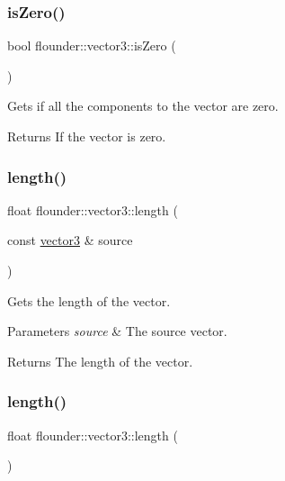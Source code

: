 \subsubsection{\texorpdfstring{is\+Zero()}{isZero()}}
{\footnotesize\ttfamily bool flounder\+::vector3\+::is\+Zero (\begin{DoxyParamCaption}{ }\end{DoxyParamCaption})}



Gets if all the components to the vector are zero. 

\begin{DoxyReturn}{Returns}
If the vector is zero. 
\end{DoxyReturn}
\mbox{\label{classflounder_1_1vector3_a2264de66d0b62a4a996586a9638650da}} 
\subsubsection{\texorpdfstring{length()}{length()}\hspace{0.1cm}{\footnotesize\ttfamily [1/2]}}
{\footnotesize\ttfamily float flounder\+::vector3\+::length (\begin{DoxyParamCaption}\item[{const \hyperlink{classflounder_1_1vector3}{vector3} \&}]{source }\end{DoxyParamCaption})\hspace{0.3cm}{\ttfamily [static]}}



Gets the length of the vector. 


\begin{DoxyParams}{Parameters}
{\em source} & The source vector. \\
\hline
\end{DoxyParams}
\begin{DoxyReturn}{Returns}
The length of the vector. 
\end{DoxyReturn}
\mbox{\label{classflounder_1_1vector3_a32bedb9a4d0d3514f716ff3d1a5b3d8b}} 
\subsubsection{\texorpdfstring{length()}{length()}\hspace{0.1cm}{\footnotesize\ttfamily [2/2]}}
{\footnotesize\ttfamily float flounder\+::vector3\+::length (\begin{DoxyParamCaption}{ }\end{DoxyParamCaption})}



